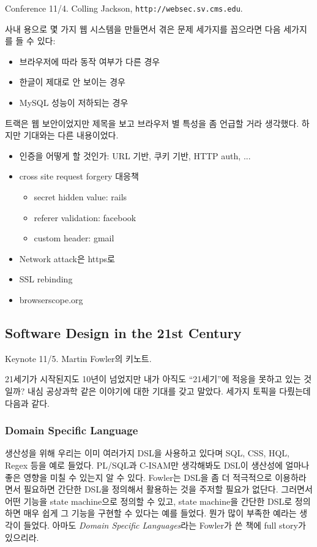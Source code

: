 \documentclass[11pt]{article}
\begin{document}
Conference 11/4. Colling Jackson, \texttt{http://websec.sv.cms.edu}.
 
사내 용으로 몇 가지 웹 시스템을 만들면서 겪은 문제 세가지를 꼽으라면 다음 
세가지를 들 수 있다:
\begin{itemize}
\item 브라우저에 따라 동작 여부가 다른 경우
\item 한글이 제대로 안 보이는 경우
\item MySQL 성능이 저하되는 경우
\end{itemize}
 
트랙은 웹 보안이었지만 제목을 보고 브라우저 별 특성을 좀 언급할 거라 생각했다.
하지만 기대와는 다른 내용이었다.
 
\begin{itemize}
\item 인증을 어떻게 할 것인가: URL 기반, 쿠키 기반, HTTP auth, ...
\item cross site request forgery 대응책
    \begin{itemize}
    \item secret hidden value: rails
    \item referer validation: facebook
    \item custom header: gmail
    \end{itemize}
\item Network  attack은 https로 
\item SSL rebinding
\item browserscope.org 
\end{itemize}
 
\subsection{Software Design in the 21st Century}

Keynote 11/5. Martin Fowler의 키노트.
 
21세기가 시작된지도 10년이 넘었지만 내가 아직도 ``21세기''에 적응을 못하고 
있는 것일까? 내심 공상과학 같은 이야기에 대한 기대를 갖고 말았다.
세가지 토픽을 다뤘는데 다음과 같다.
 
\subsubsection{Domain Specific Language}
 
생산성을 위해 우리는 이미 여러가지 DSL을 사용하고 있다며
SQL, CSS, HQL, Regex 등을 예로 들었다.
PL/SQL과 C-ISAM만 생각해봐도 DSL이 생산성에 얼마나 좋은 영향을 미칠 수 있는지
알 수 있다. Fowler는 DSL을 좀 더 적극적으로 이용하라면서 필요하면 간단한
DSL을 정의해서 활용하는 것을 주저할 필요가 없단다. 그러면서
어떤 기능을 state machine으로 정의할 수 있고, state machine을 간단한 DSL로
정의하면 매우 쉽게 그 기능을 구현할 수 있다는 예를 들었다. 뭔가 많이 부족한
예라는 생각이 들었다.
아마도 \textit{Domain Specific Languages}\cite{fowler}라는 Fowler가 쓴 책에 
full story가 있으리라.
\end{document}
